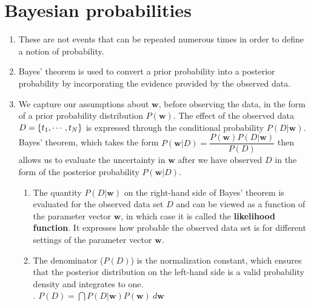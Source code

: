 







\section{Bayesian probabilities}

\begin{enumerate}
    \item These are not events that can be repeated numerous times in order to define a notion of probability.
    \hfill \cite{ml/book/Pattern-Recognition-And-Machine-Learning/Christopher-M-Bishop}

    \item Bayes' theorem is used to convert a prior probability into a posterior probability by incorporating the evidence provided by the observed data.
    \hfill \cite{ml/book/Pattern-Recognition-And-Machine-Learning/Christopher-M-Bishop}

    \item We capture our assumptions about $\bm{w}$, before observing the data, in the form of a prior probability distribution $P(\bm{w})$.
    The effect of the observed data $D = \left\{t_1, \cdots , t_N \right\}$ is expressed through the conditional probability $P(D|\bm{w})$.
    Bayes’ theorem, which takes the form
    $
        P(\bm{w}|D) = \dfrac{P(\bm{w})P(D|\bm{w})}{P(D)}
    $
    then allows us to evaluate the uncertainty in $\bm{w}$ after we have observed $D$ in the form of the posterior probability $P(\bm{w}|D)$.
    \hfill \cite{ml/book/Pattern-Recognition-And-Machine-Learning/Christopher-M-Bishop}
    \begin{enumerate}
        \item The quantity $P(D|\bm{w})$ on the right-hand side of Bayes' theorem is evaluated for the observed data set $D$ and can be viewed as a function of the parameter vector $\bm{w}$, in which case it is called the \textbf{likelihood function}.
        It expresses how probable the observed data set is for different settings of the parameter vector $\bm{w}$.
        \hfill \cite{ml/book/Pattern-Recognition-And-Machine-Learning/Christopher-M-Bishop}

        \item The denominator ($P(D)$) is the normalization constant, which ensures that the posterior distribution on the left-hand side is a valid probability density and integrates to one.
        \hfill \cite{ml/book/Pattern-Recognition-And-Machine-Learning/Christopher-M-Bishop}
        \\
        .\hfill
        $
            P(D) = \dint P(D|\bm{w})P(\bm{w})\ d\bm{w}
        $
        \hfill \cite{ml/book/Pattern-Recognition-And-Machine-Learning/Christopher-M-Bishop}


\end{enumerate}
\end{enumerate}
